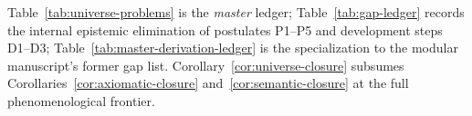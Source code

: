 \begin{remark}
Table~\ref{tab:universe-problems} is the \emph{master} ledger;
Table~\ref{tab:gap-ledger} records the internal epistemic elimination of
postulates P1--P5 and development steps D1--D3;
Table~\ref{tab:master-derivation-ledger} is the specialization to the modular
manuscript's former gap list. Corollary~\ref{cor:universe-closure} subsumes
Corollaries~\ref{cor:axiomatic-closure} and~\ref{cor:semantic-closure} at the
full phenomenological frontier.
\end{remark}